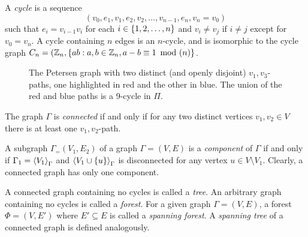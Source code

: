 \documentclass[m3380-lec-main.tex]{subfiles}
\begin{document}
\begin{defn}
A \emph{cycle} is a sequence 
\[ (v_0,e_1,v_1, e_2, v_2, \ldots, v_{n-1}, e_n, v_n = v_0)\]
such that $e_i = v_{i-1}v_i$ for each $i\in\left\{1,2,\ldots,n\right\}$ and $v_i\neq v_j$ if $i\neq j$ except for $v_0=v_n$. A cycle containing $n$ edges is an $n$-cycle, and is isomorphic to the cycle graph $C_n=(\mathbb{Z}_n, \left\{ab:a,b\in\mathbb{Z}_n, a-b\equiv 1~\operatorname{mod}~(n)\right\}$.
\end{defn}

\begin{figure}[hbt]
\begin{center}
\end{center}
\caption{The Petersen graph with two distinct (and openly disjoint) $v_1,v_3$-paths, one highlighted in red and the other in blue. The union of the red and blue paths is a 9-cycle in $\Pi$.}
\end{figure}

\begin{defn}
The graph $\Gamma$ is \emph{connected} if and only if for any two distinct vertices $v_1,v_2\in V$ there is at least one $v_1,v_2$-path.
\end{defn}

\begin{defn} A subgraph $\Gamma_=(V_1,E_2)$ of a graph $\Gamma=(V,E)$ is a \emph{component} of $\Gamma$ if and only if $\Gamma_1=\left\langle V_1\right\rangle_\Gamma$ and $\left\langle V_1\cup\left\{u\right\}\right\rangle_\Gamma$ is disconnected for any vertex $u\in V\setminus V_1$. Clearly, a connected graph has only one component.
\end{defn}

\begin{defn} A connected graph containing no cycles is called a \emph{tree}. An arbitrary graph containing no cycles is called a \emph{forest}. For a given graph $\Gamma=(V,E)$, a forest $\Phi=(V,E')$ where $E'\subseteq E$ is called a \emph{spanning forest}. A \emph{spanning tree} of a connected graph is defined analogously.
\end{defn}
\end{document}
